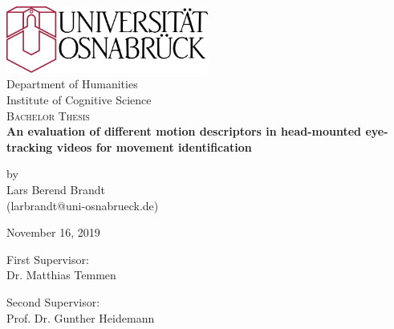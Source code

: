 \documentclass[Bachelorarbeit.tex]{subfiles}
\begin{document}
\begin{titlepage}
\begin{center}

\includegraphics[width=0.5\textwidth]{Images/uniLogo}~\\[0.7cm]

\large{Department of Humanities \\Institute of Cognitive Science} \\[2.5cm]


\textsc{\Large Bachelor Thesis}\\[0.7cm]
{ \huge \textbf{An evaluation of different motion descriptors in head-mounted eye-tracking videos for movement identification}}
\\[1.5cm]

\begin{center}
{\Large by \vspace{5mm} \\ Lars Berend Brandt}\\ (larbrandt@uni-osnabrueck.de) \\ 
\end{center}
\vspace{5mm} \vfil
{\large November 16, 2019} \vfill

\noindent
\begin{minipage}{0.4\textwidth}
\begin{flushleft} \large
First Supervisor: \\
Dr. Matthias Temmen
\end{flushleft}
\end{minipage}%
\begin{minipage}{0.4\textwidth}
\begin{flushright} \large
Second Supervisor:\\
Prof. Dr. Gunther Heidemann

\end{flushright}
\end{minipage}

\vfill



\end{center}
\end{titlepage}
\end{document}
